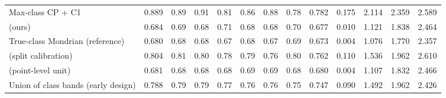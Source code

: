 \begin{table}[!htbp]
{\begin{tabular}{lcccccccccccc}
Max-class CP + C1 & 0.889 & 0.89 & 0.91 & 0.81 & 0.86 & 0.88 & 0.78 & 0.782 & 0.175 & 2.114 & 2.359 & 2.589 \\
\gamut{} (ours) & 0.684 & 0.69 & 0.68 & 0.71 & 0.68 & 0.68 & 0.70 & 0.677 & 0.010 & 1.121 & 1.838 & 2.464 \\
True-class Mondrian (reference) & 0.680 & 0.68 & 0.68 & 0.67 & 0.68 & 0.67 & 0.69 & 0.673 & 0.004 & 1.076 & 1.770 & 2.357 \\
\gamut{} (split calibration) & 0.804 & 0.81 & 0.80 & 0.78 & 0.79 & 0.76 & 0.80 & 0.762 & 0.110 & 1.536 & 1.962 & 2.610 \\
\gamut{} (point-level unit) & 0.681 & 0.68 & 0.68 & 0.68 & 0.69 & 0.69 & 0.68 & 0.680 & 0.004 & 1.107 & 1.832 & 2.466 \\
Union of class bands (early design) & 0.788 & 0.79 & 0.79 & 0.77 & 0.76 & 0.76 & 0.75 & 0.747 & 0.090 & 1.492 & 1.962 & 2.426 \\
\bottomrule
\end{tabular}}
\end{table}

